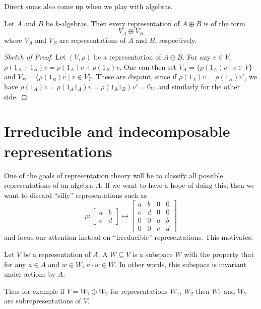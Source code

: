 Direct sums also come up when we play with algebras.
\begin{proposition}
	\label{prop:rep_direct_sum}
	Let $A$ and $B$ be $k$-algebras.
	Then every representation of $A \oplus B$ is of the form
	\[ V_A \oplus V_B \]
	where $V_A$ and $V_B$ are representations of $A$ and $B$, respectively.
\end{proposition}
\begin{proof}[Sketch of Proof]
	Let $(V, \rho)$ be a representation of $A \oplus B$.
	For any $v \in V$, $\rho(1_A+1_B)v = \rho(1_A)v + \rho(1_B)v$.
	One can then set $V_A = \{ \rho(1_A)v \mid v \in V \}$
	and $V_B = \{ \rho(1_B)v \mid v \in V \}$.
	These are disjoint, since if $\rho(1_A) v = \rho(1_B) v'$,
	we have $\rho(1_A)v = \rho(1_A1_A)v = \rho(1_A1_B) v' = 0_V$,
	and similarly for the other side.
\end{proof}

\section{Irreducible and indecomposable representations}

One of the goals of representation theory will be to classify
all possible representations of an algebra $A$.
If we want to have a hope of doing this,
then we want to discard ``silly'' representations such as
\[
	\rho :
	\begin{bmatrix} a & b \\ c & d \end{bmatrix}
	\mapsto
	\begin{bmatrix} a & b & 0 & 0 \\ c & d & 0 & 0 \\
		0 & 0 & a & b \\ 0 & 0 & c & d \end{bmatrix}
\]
and focus our attention instead on ``irreducible'' representations.
This motivates:
\begin{definition}
	Let $V$ be a representation of $A$.
	A  $W \subseteq V$ is a subspace $W$
	with the property that for any $a \in A$ and $w \in W$,
	$a \cdot w \in W$.
	In other words, this subspace is invariant under actions by $A$.
\end{definition}
Thus for example if $V = W_1 \oplus W_2$ for representations $W_1$, $W_2$
then $W_1$ and $W_2$ are subrepresentations of $V$.

